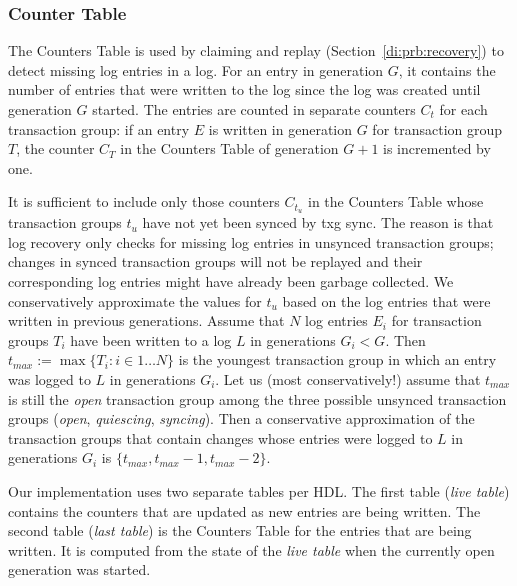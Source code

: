 \documentclass[12pt,a4paper,twoside]{book}
\begin{document}
\subsubsection{Counter Table}\label{di:prb:write:logstructureencoding}
The Counters Table is used by claiming and replay (Section~\ref{di:prb:recovery}) to detect missing log entries in a log.
For an entry in generation $G$, it contains the number of entries that were written to the log since the log was created until generation $G$ started.
The entries are counted in separate counters $C_t$ for each transaction group:
if an entry $E$ is written in generation $G$ for transaction group $T$, the counter $C_T$ in the Counters Table of generation $G+1$ is incremented by one.

It is sufficient to include only those counters $C_{t_{u}}$ in the Counters Table whose transaction groups $t_u$ have not yet been synced by txg sync.
The reason is that log recovery only checks for missing log entries in unsynced transaction groups; changes in synced transaction groups will not be replayed and their corresponding log entries might have already been garbage collected.
We conservatively approximate the values for $t_u$ based on the log entries that were written in previous generations.
Assume that $N$ log entries $E_i$ for transaction groups $T_i$ have been written to a log $L$ in generations $G_i < G$.
Then $t_{max} := \max \{ T_i : i \in 1 \dots N \}$ is the youngest transaction group in which an entry was logged to $L$ in generations $G_i$.
Let us (most conservatively!) assume that $t_{max}$ is still the \textit{open} transaction group among the three possible unsynced transaction groups (\textit{open}, \textit{quiescing}, \textit{syncing}).
Then a conservative approximation of the transaction groups that contain changes whose entries were logged to $L$ in generations $G_i$ is $\{ t_{max}, t_{max}-1, t_{max}-2 \}$.

Our implementation uses two separate tables per HDL.
The first table (\textit{live table}) contains the counters that are updated as new entries are being written.
The second table (\textit{last table}) is the Counters Table for the entries that are being written.
It is computed from the state of the \textit{live table} when the currently open generation was started.
\end{document}
